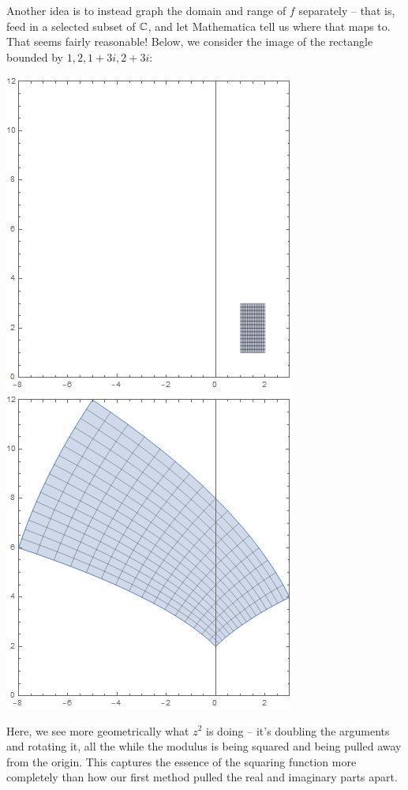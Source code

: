 \documentclass[12pt]{scrartcl}
\begin{document}
Another idea is to instead graph the domain and range of $f$ separately -- that is, feed in a selected subset of $\mathbb C$, and let Mathematica tell us where that maps to. That seems fairly reasonable! Below, we consider the image of the rectangle bounded by $1, 2, 1+3i, 2+3i$:
\begin{center}
	\includegraphics[scale=0.5]{images/domzsqr.png}
	\includegraphics[scale=0.5]{images/ranzsqr.png}
\end{center}
Here, we see more geometrically what $z^2$ is doing -- it's doubling the arguments and rotating it, all the while the modulus is being squared and being pulled away from the origin. This captures the essence of the squaring function more completely than how our first method pulled the real and imaginary parts apart.
\end{document}
